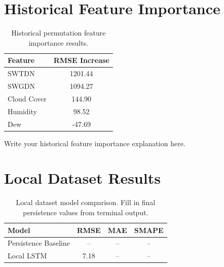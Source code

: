 \documentclass[11pt]{article}
\begin{document}

\section{Historical Feature Importance}


\begin{table}[H]
\centering
\begin{tabular}{lc}
\toprule
Feature & RMSE Increase \\
\midrule
SWTDN & 1201.44 \\
SWGDN & 1094.27 \\
Cloud Cover & 144.90 \\
Humidity & 98.52 \\
Dew & -47.69 \\
\bottomrule
\end{tabular}
\caption{Historical permutation feature importance results.}
\label{tab:historicalfeatures}
\end{table}

Write your historical feature importance explanation here.

\section{Local Dataset Results}


\begin{table}[H]
\centering
\begin{tabular}{lccc}
\toprule
Model & RMSE & MAE & SMAPE \\
\midrule
Persistence Baseline & -- & -- & -- \\
Local LSTM & 7.18 & -- & -- \\
\bottomrule
\end{tabular}
\caption{Local dataset model comparison. Fill in final persistence values from terminal output.}
\label{tab:localresults}
\end{table}
\end{document}
